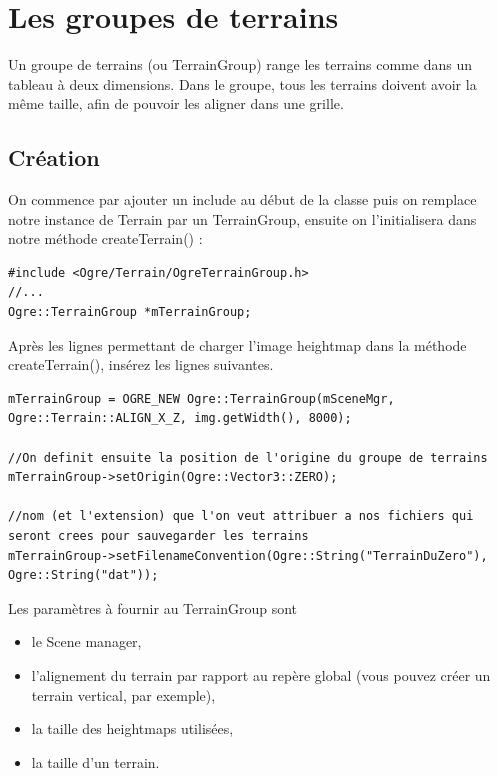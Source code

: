 \section{Les groupes de terrains}

Un groupe de terrains (ou TerrainGroup) range les terrains comme dans un tableau \`a deux dimensions. Dans le groupe, tous les terrains doivent avoir la m\^eme taille, afin de pouvoir les aligner dans une grille.



\subsection{Cr\'eation}

On commence par ajouter un include au d\'ebut de la classe puis on remplace notre instance de Terrain par un TerrainGroup, ensuite on l'initialisera dans notre m\'ethode createTerrain() :

\begin{lstlisting}[caption={TerrainGroup: include et cr\'eation}]
#include <Ogre/Terrain/OgreTerrainGroup.h>
//...
Ogre::TerrainGroup *mTerrainGroup;
\end{lstlisting}

Apr\`es les lignes permettant de charger l'image heightmap dans la m\'ethode createTerrain(), ins\'erez les lignes suivantes.

\begin{lstlisting}[caption={}]
mTerrainGroup = OGRE_NEW Ogre::TerrainGroup(mSceneMgr, Ogre::Terrain::ALIGN_X_Z, img.getWidth(), 8000);

//On definit ensuite la position de l'origine du groupe de terrains
mTerrainGroup->setOrigin(Ogre::Vector3::ZERO);

//nom (et l'extension) que l'on veut attribuer a nos fichiers qui seront crees pour sauvegarder les terrains
mTerrainGroup->setFilenameConvention(Ogre::String("TerrainDuZero"), Ogre::String("dat"));
\end{lstlisting}

Les param\`etres \`a fournir au TerrainGroup sont
\begin{itemize}
\item le Scene manager,
\item l'alignement du terrain par rapport au rep\`ere global (vous pouvez cr\'eer un terrain vertical, par exemple),
\item la taille des heightmaps utilis\'ees, 
\item la taille d'un terrain.
\end{itemize}

